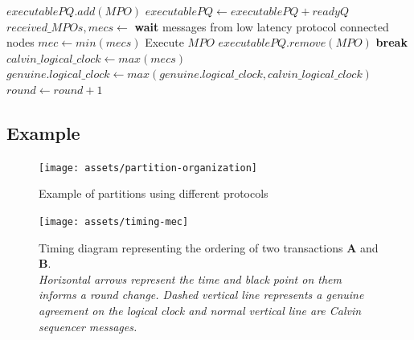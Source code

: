 \documentclass[a4paper, 10pt]{article}
\begin{document}
\begin{algorithmic}[1]
                \State $executablePQ.add(MPO)$
            \EndIf
        \EndFor \label{alg:line:get_multicast:end}
        \State
         \label{alg:line:calvin_dispatch}
        \State $executablePQ \gets executablePQ + readyQ$
        \State $received\_MPOs, mecs \gets$ \textbf{wait} messages from low latency protocol connected nodes \label{alg:line:calvin_dispatch:end}
        \State
        \State $mec \gets min(mecs)$ \label{alg:line:execution}
        \State
                \State Execute $MPO$
                \State $executablePQ.remove(MPO)$
            \Else
                \State \textbf{break}
            \EndIf
        \EndFor \label{alg:line:execution:end}
        \State
        \State $calvin\_logical\_clock \gets max(mecs)$ \label{alg:line:val_update}
        \State $genuine.logical\_clock \gets max(genuine.logical\_clock, calvin\_logical\_clock)$ \label{alg:line:val_update:end}
        \State
        \State $round \gets round+1$

    \EndUpon
\end{algorithmic}

\subsection{Example}

\begin{figure}
    \centering
    \texttt{[image: assets/partition-organization]}
    \caption{Example of partitions using different protocols}
    \label{fig:partition}
\end{figure}
\begin{figure}
    \centering
    \texttt{[image: assets/timing-mec]}
    \caption{Timing diagram representing the ordering of two transactions \textbf{A} and \textbf{B}.\\
    \textit{Horizontal arrows represent the time and black point on them informs a round change.
    Dashed vertical line represents a genuine agreement on the logical clock and normal vertical line are
    Calvin sequencer messages.}}
    \label{fig:timing}
\end{figure}
\end{document}
